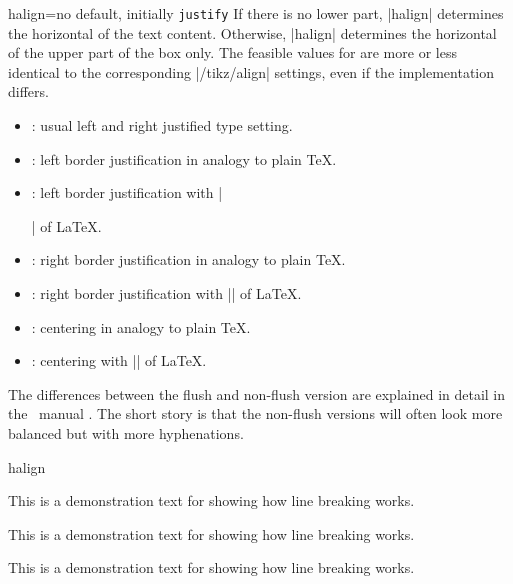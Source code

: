 \begin{docTcbKey}[][doc new=2015-05-07]{halign}{=}{no default, initially \texttt{justify}}
  If there is no lower part, |halign| determines the horizontal 
  of the text content.
  Otherwise, |halign| determines the horizontal 
  of the upper part of the box only.
  The feasible values for  are more or less identical to
  the corresponding |/tikz/align| settings, even if the implementation differs.
  \begin{itemize}
  \item{}: usual left and right justified type setting.
  \item{}: left border justification in analogy to plain \TeX.
  \item{}: left border justification with |\raggedright| of \LaTeX.
  \item{}: right border justification in analogy to plain \TeX.
  \item{}: right border justification with |\raggedleft| of \LaTeX.
  \item{}: centering in analogy to plain \TeX.
  \item{}: centering with |\centering| of \LaTeX.
  \end{itemize}
  The differences between the flush and non-flush version are explained in
  detail in the \tikzname\ manual \cite{tantau:2015a}. The short story is that
  the non-flush versions will often look more balanced but with more
  hyphenations.

\begin{exdispExample}{halign}

\begin{tcolorbox}[adjusted title=flush center,halign=flush center]
This is a demonstration text for showing how line breaking works.
\end{tcolorbox}
\begin{tcolorbox}[adjusted title=flush left,halign=flush left]
This is a demonstration text for showing how line breaking works.
\end{tcolorbox}
\begin{tcolorbox}[adjusted title=flush right,halign=flush right]
This is a demonstration text for showing how line breaking works.
\end{tcolorbox}


\end{exdispExample}
\end{docTcbKey}
